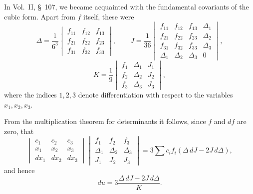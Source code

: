 \documentclass[11pt]{article}
\begin{document}
In Vol.~II, \S~107, we became acquainted with the fundamental covariants of the cubic form. Apart from $f$ itself, these were
\[
\Delta=\frac1{6^3}\begin{vmatrix}
f_{11}&f_{12}&f_{13}\\
f_{21}&f_{22}&f_{23}\\
f_{31}&f_{32}&f_{33}
\end{vmatrix},\qquad
J=\frac1{36}\begin{vmatrix}
f_{11}&f_{12}&f_{13}&\Delta_1\\
f_{21}&f_{22}&f_{23}&\Delta_2\\
f_{31}&f_{32}&f_{33}&\Delta_3\\
\Delta_1&\Delta_2&\Delta_3&0
\end{vmatrix},
\]
\[
K=\frac19\begin{vmatrix}
f_1&\Delta_1&J_1\\
f_2&\Delta_2&J_2\\
f_3&\Delta_3&J_3
\end{vmatrix},
\]
where the indices $1,2,3$ denote differentiation with respect to the variables $x_1,x_2,x_3$.

From the multiplication theorem for determinants it follows, since $f$ and $df$ are zero, that
\[
\begin{vmatrix}
c_1&c_2&c_3\\
x_1&x_2&x_3\\
dx_1&dx_2&dx_3
\end{vmatrix}
\begin{vmatrix}
f_1&f_2&f_3\\
\Delta_1&\Delta_2&\Delta_3\\
J_1&J_2&J_3
\end{vmatrix}
=3\sum c_if_i(\Delta\,dJ-2J\,d\Delta),
\]
and hence
\begin{equation}
du=3\frac{\Delta\,dJ-2J\,d\Delta}{K}.
\tag{7}
\end{equation}
\end{document}

